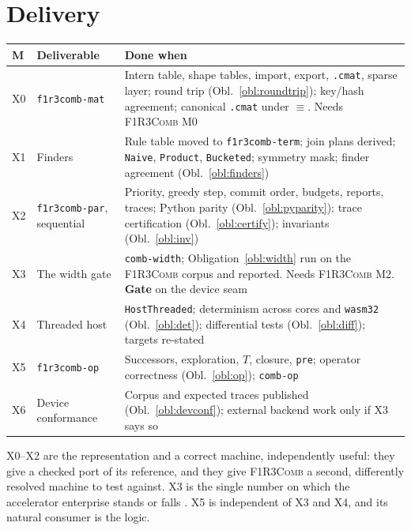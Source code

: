 \documentclass[11pt,a4paper]{article}
\newcommand{\code}[1]{\texttt{#1}}
\newcommand{\Comb}{\textsc{F1R3Comb}}
\newcommand{\scong}{\equiv}
\theoremstyle{definition}
\theoremstyle{plain}
\begin{document}
\section{Delivery}

\begin{center}
\begin{tabularx}{\linewidth}{@{}ll>{\raggedright\arraybackslash}X@{}}
\toprule
M & Deliverable & Done when\\
\midrule
X0 & \code{f1r3comb-mat} & Intern table, shape tables, import, export,
\code{.cmat}, sparse layer; round trip (Obl.~\ref{obl:roundtrip});
key/hash agreement; canonical \code{.cmat} under $\scong$. Needs \Comb{} M0\\
X1 & Finders & Rule table moved to \code{f1r3comb-term}; join plans derived;
\code{Naive}, \code{Product}, \code{Bucketed}; symmetry mask; finder agreement
(Obl.~\ref{obl:finders})\\
X2 & \code{f1r3comb-par}, sequential & Priority, greedy step, commit order,
budgets, reports, traces; Python parity (Obl.~\ref{obl:pyparity}); trace
certification (Obl.~\ref{obl:certify}); invariants (Obl.~\ref{obl:inv})\\
X3 & The width gate & \code{comb-width}; Obligation~\ref{obl:width} run on the
\Comb{} corpus and reported. Needs \Comb{} M2. \textbf{Gate} on the device
seam\\
X4 & Threaded host & \code{HostThreaded}; determinism across cores and
\code{wasm32} (Obl.~\ref{obl:det}); differential tests (Obl.~\ref{obl:diff});
targets re-stated\\
X5 & \code{f1r3comb-op} & Successors, exploration, $T$, closure, \code{pre};
operator correctness (Obl.~\ref{obl:op}); \code{comb-op}\\
X6 & Device conformance & Corpus and expected traces published
(Obl.~\ref{obl:devconf}); external backend work only if X3 says so\\
\bottomrule
\end{tabularx}
\end{center}

\noindent
X0--X2 are the representation and a correct machine, independently useful:
they give \cite{matnote} a checked port of its reference, and they give
\Comb{} a second, differently resolved machine to test against. X3 is the
single number on which the accelerator enterprise stands or falls
\cite[Princ.~10.4]{matnote}. X5 is independent of X3 and X4, and its natural
consumer is the logic.
\end{document}
